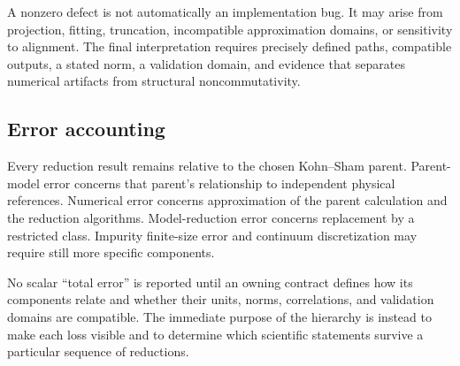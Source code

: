 A nonzero defect is not automatically an implementation bug. It may arise from
projection, fitting, truncation, incompatible approximation domains, or
sensitivity to alignment. The final interpretation requires precisely defined
paths, compatible outputs, a stated norm, a validation domain, and evidence
that separates numerical artifacts from structural noncommutativity.

\subsection{Error accounting}


Every reduction result remains relative to the chosen Kohn--Sham parent.
Parent-model error concerns that parent's relationship to independent physical
references. Numerical error concerns approximation of the parent calculation
and the reduction algorithms. Model-reduction error concerns replacement by a
restricted class. Impurity finite-size error and continuum discretization may
require still more specific components.

No scalar ``total error'' is reported until an owning contract defines how its
components relate and whether their units, norms, correlations, and validation
domains are compatible. The immediate purpose of the hierarchy is instead to
make each loss visible and to determine which scientific statements survive a
particular sequence of reductions.
